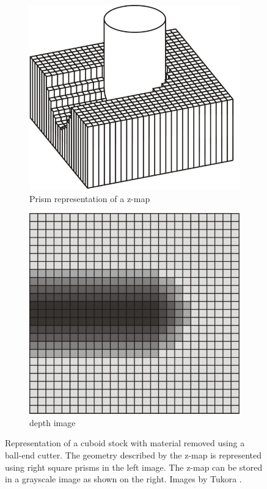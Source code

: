 \begin{description}
	\begin{figure}[h]
		\centering
		\begin{subfigure}[b]{0.4\textwidth}
			\includegraphics[width=\textwidth]{images/zmap}
			\caption{Prism representation of a z-map}
			\label{fig:zmap}
		\end{subfigure}
		\begin{subfigure}[b]{0.4\textwidth}
			\includegraphics[width=\textwidth]{images/depth_image}
			\caption{depth image}
			\label{fig:depth_image}
		\end{subfigure}
		\caption{
			Representation of a cuboid stock with material removed using a ball-end cutter.
			The geometry described by the z-map is represented using right square prisms in the left image.
			The z-map can be stored in a grayscale image as shown on the right.
			Images by Tukora \cite{virtual_machining_review}.
		}
	\end{figure}
	

\end{description}
